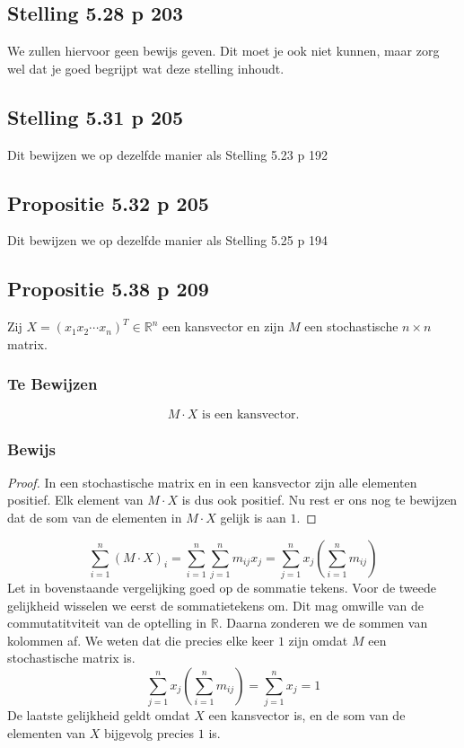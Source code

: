 \documentclass[lineaire_algebra_oplossingen.tex]{subfiles}
\begin{document}
\subsection{Stelling 5.28 p 203}
We zullen hiervoor geen bewijs geven. Dit moet je ook niet kunnen, maar zorg wel dat je goed begrijpt wat deze stelling inhoudt.

\subsection{Stelling 5.31 p 205}
Dit bewijzen we op dezelfde manier als Stelling 5.23 p 192

\subsection{Propositie 5.32 p 205}
Dit bewijzen we op dezelfde manier als Stelling 5.25 p 194

\subsection{Propositie 5.38 p 209}
Zij $X = (x_1 x_2 \cdots x_n)^T \in \mathbb{R}^n$ een kansvector en zijn $M$ een stochastische $n\times n$ matrix.
\subsubsection*{Te Bewijzen}
\[
M\cdot X \text{ is een kansvector.}
\]
\subsubsection*{Bewijs}
\begin{proof}
In een stochastische matrix en in een kansvector zijn alle elementen positief. Elk element van $M\cdot X$ is dus ook positief. Nu rest er ons nog te bewijzen dat de som van de elementen in $M \cdot X$ gelijk is aan $1$.
\end{proof}
\[
\sum_{i=1}^n(M\cdot X)_i = \sum_{i=1}^n\sum_{j=1}^nm_{ij}x_j= \sum_{j=1}^nx_j(\sum_{i=1}^nm_{ij})
\]
Let in bovenstaande vergelijking goed op de sommatie tekens. Voor de tweede gelijkheid wisselen we eerst de sommatietekens om. Dit mag omwille van de commutatitviteit van de optelling in $\mathbb{R}$. Daarna zonderen we de sommen van kolommen af. We weten dat die precies elke keer $1$ zijn omdat $M$ een stochastische matrix is.
\[
\sum_{j=1}^nx_j(\sum_{i=1}^nm_{ij}) = \sum_{j=1}^nx_j = 1
\]
De laatste gelijkheid geldt omdat $X$ een kansvector is, en de som van de elementen van $X$ bijgevolg precies $1$ is.
\end{document}

